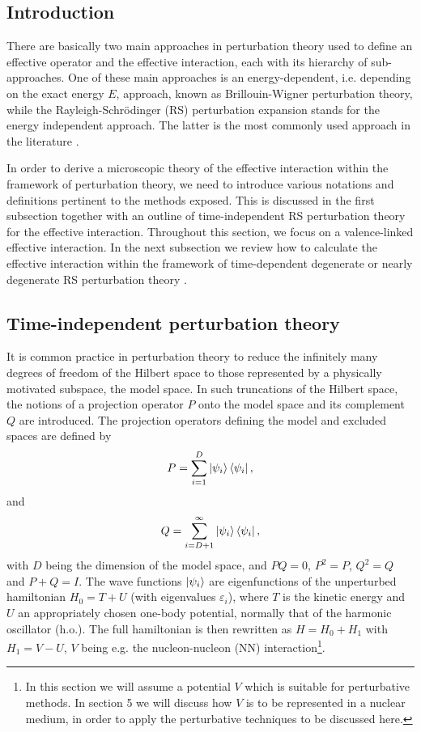 \subsection{Introduction}
There are basically two main approaches in perturbation theory used
to define an effective operator and the effective interaction,
each with its hierarchy of sub-approaches. One of these main
approaches is an energy-dependent, i.e. depending on the
exact energy $E$, approach, known as Brillouin-Wigner
perturbation theory, while the Rayleigh-Schr\"{o}dinger (RS) perturbation
expansion stands for the energy independent approach. The latter is
the most commonly used approach in the literature \cite{ko90,lm85}.

In order to derive a microscopic theory of the effective interaction
within the framework of perturbation theory, we need to introduce various
notations and definitions pertinent to the methods exposed.
This is discussed in the first subsection together with an outline of
time-independent RS perturbation theory for the effective interaction.
Throughout this section, we focus on a valence-linked effective
interaction.
In the next subsection  we review how to
calculate the effective interaction
within the framework of time-dependent degenerate
or nearly degenerate
RS perturbation theory \cite{ko90,no88}.

\subsection{Time-independent
perturbation theory}

It is common practice in perturbation theory to reduce the infinitely
many degrees of freedom of the Hilbert space to those represented
by a physically motivated subspace, the model space.
In such truncations of the Hilbert space, the notions of a projection
operator $P$ onto the model space and its complement $Q$ are
introduced. The projection operators defining the model and excluded
spaces are defined by
\begin{equation}
    P=\sum_{i=1}^{D} \left| \psi_i \right\rangle\left\langle \psi_i \right|,
\end{equation}
and
\begin{equation}
    Q=\sum_{i=D+1}^{\infty} \left| \psi_i \right\rangle\left\langle \psi_i \right|,
\end{equation}
with $D$ being the dimension of the model space, and $PQ=0$, $P^2 =P$,
$Q^2 =Q$ and $P+Q=I$. The wave functions $\left| \psi_i \right\rangle$ are eigenfunctions
of the unperturbed hamiltonian $H_0 = T+U$ (with eigenvalues
$\varepsilon_i$), where $T$ is the kinetic
energy and $U$ an appropriately chosen one-body potential, normally
that of the
harmonic oscillator (h.o.). The full hamiltonian
is then rewritten as $H=H_0 +H_1$ with $H_1=V-U$, $V$ being e.g. the
nucleon-nucleon (NN) interaction\footnote{In this section we will
assume a potential $V$ which is suitable for perturbative
methods. In section 5 we will discuss how $V$ is to be represented
in a nuclear medium, in order to apply the perturbative
techniques to be discussed here.}.

